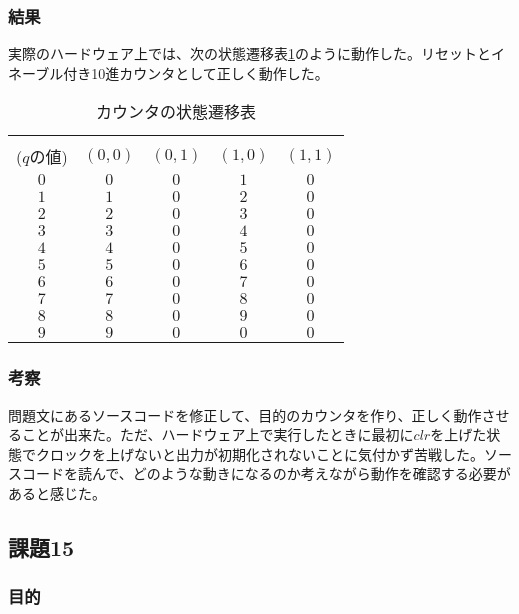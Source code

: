 \documentclass[a4paper]{jarticle}
\begin{document}
\subsubsection{結果}
実際のハードウェア上では、次の状態遷移表\ref{Work14StateTransitionTable}のように動作した。リセットとイネーブル付き10進カウンタとして正しく動作した。
\begin{table}[ht]
	\begin{center}
		\caption{カウンタの状態遷移表}
		\label{Work14StateTransitionTable}
		\begin{tabular}{|c||c|c|c|c|}
			\hline
			\backslashbox{現状態\\($q$の値)}{$\left(en,clr\right)$}	&$\left(0,0\right)$	&$\left(0,1\right)$	&$\left(1,0\right)$	&$\left(1,1\right)$\\	\hline
			$0$							&$0$			&$0$			&$1$			&$0$\\			\hline
			$1$							&$1$			&$0$			&$2$			&$0$\\			\hline
			$2$							&$2$			&$0$			&$3$			&$0$\\			\hline
			$3$							&$3$			&$0$			&$4$			&$0$\\			\hline
			$4$							&$4$			&$0$			&$5$			&$0$\\			\hline
			$5$							&$5$			&$0$			&$6$			&$0$\\			\hline
			$6$							&$6$			&$0$			&$7$			&$0$\\			\hline
			$7$							&$7$			&$0$			&$8$			&$0$\\			\hline
			$8$							&$8$			&$0$			&$9$			&$0$\\			\hline
			$9$							&$9$			&$0$			&$0$			&$0$\\			\hline
		\end{tabular}
	\end{center}
\end{table}
\subsubsection{考察}
問題文にあるソースコードを修正して、目的のカウンタを作り、正しく動作させることが出来た。ただ、ハードウェア上で実行したときに最初に$clr$を上げた状態でクロックを上げないと出力が初期化されないことに気付かず苦戦した。ソースコードを読んで、どのような動きになるのか考えながら動作を確認する必要があると感じた。
\subsection{課題15}
\subsubsection{目的}
\end{document}
